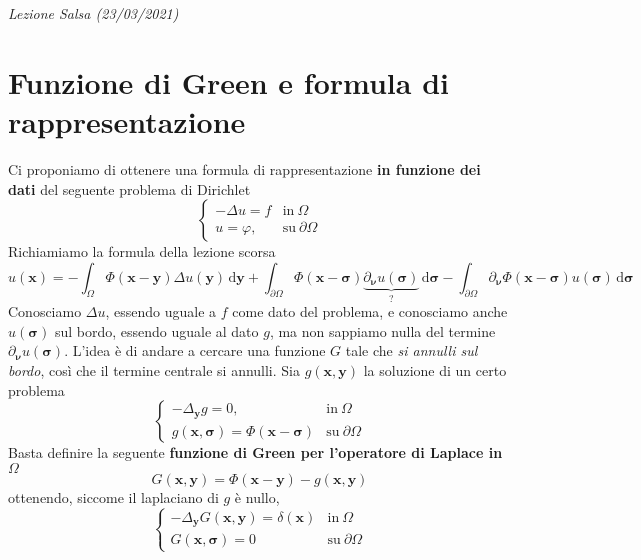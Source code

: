 \documentclass[10pt,a4paper,twoside,openright]{book}
\newcounter{conteggioS}
\newcommand{\LezioneS}[1]{
	\stepcounter{conteggioS}
	\textit{Lezione Salsa \arabic{conteggioS} (#1)}
	}
\newcommand{\x}{\mathbf{x}}
\newcommand{\y}{\mathbf{y}}
\newcommand{\sigg}{\bm{\sigma}}
\newcommand{\nuu}{\bm{\nu}}
\newcommand{\de}{\,\mathrm d}
\newcommand{\dyy}{\de \y}
\newcommand{\dsig}{\de \sigg}
\begin{document}
\LezioneS{23/03/2021}
\section{Funzione di Green e formula di rappresentazione}

Ci proponiamo di ottenere una formula di rappresentazione \textbf{in funzione dei dati} del seguente problema di Dirichlet
\begin{equation}
	\begin{cases}
		-\Delta u=f & \text{in} \ \Omega          \\
		u=\varphi , & \text{su} \ \partial \Omega 
	\end{cases}
	\label{eq:sol-green-pb-dirichlet}
\end{equation}
Richiamiamo la formula della lezione scorsa
\begin{equation}
	u(\x) =-\int _{\Omega } \Phi (\x-\y) \Delta u(\y) \dyy+\int _{\partial \Omega } \Phi (\x-\sigg) \underbrace{\partial _{\nuu} u(\sigg)}_{?} \dsig -\int _{\partial \Omega } \partial _{\nuu} \Phi (\x-\sigg) u(\sigg) \dsig 
	\label{eq:richiamo-formula-green}
\end{equation}
Conosciamo $\Delta u$, essendo uguale a $f$ come dato del problema, e conosciamo anche $u(\sigg)$ sul bordo, essendo uguale al dato $g$, ma non sappiamo nulla del termine $\partial _{\nuu} u(\sigg)$. L'idea è di andare a cercare una funzione $G$ tale che \textit{si annulli sul bordo}, così che il termine centrale si annulli. Sia $g(\x,\y)$ la soluzione di un certo problema
\begin{equation}
	\begin{cases}
		-\Delta _{\y} g=0,                & \text{in} \ \Omega          \\
		g(\x,\sigg) =\Phi (\x-\sigg) & \text{su} \ \partial \Omega 
	\end{cases}
	\label{eq:sol-green-pb-unico}
\end{equation}
Basta definire la seguente \textbf{funzione di Green per l'operatore di Laplace in} $\Omega $
\begin{equation*}
	\boxed{G(\x,\y) =\Phi (\x-\y) -g(\x,\y)}
\end{equation*}
ottenendo, siccome il laplaciano di $g$ è nullo,
\begin{equation*}
	\begin{cases}
		-\Delta _{\y} G(\x,\y) =\delta (\x) & \text{in} \ \Omega          \\
		G(\x,\sigg) =0                  & \text{su} \ \partial \Omega 
	\end{cases}
\end{equation*}
\end{document}
